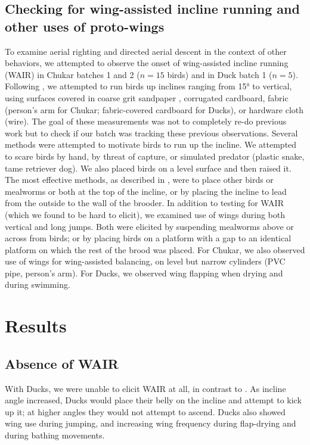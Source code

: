 \documentclass[10pt]{article}
\begin{document}

\subsection{Checking for wing-assisted incline running and other uses of proto-wings}
To examine aerial righting and directed aerial descent in the context of other behaviors, we attempted to observe the onset of wing-assisted incline running (WAIR) \citep{Dial:2003} in Chukar batches 1 and 2 ($n=15$ birds) and in Duck batch 1 ($n=5$).  Following \citep{Dial:2003}, we attempted to run birds up inclines ranging from \ang{15} to vertical, using surfaces covered in coarse grit sandpaper \citep{Dial:2003, Dial:2008, Jackson:2009, Tobalske:2011, Dial:2012}, corrugated cardboard, fabric (person's arm for Chukar; fabric-covered cardboard for Ducks), or hardware cloth (wire).  The goal of these measurements was not to completely re-do previous work \citep{Dial:2003} but to check if our batch was tracking these previous observations.   
	Several methods were attempted to motivate birds to run up the incline.  We attempted to scare birds by hand, by threat of capture, or simulated predator (plastic snake, tame retriever dog).  We also placed birds on a level surface and then raised it.  The most effective methods, as described in \citep{Jackson:2009}, were to place other birds or mealworms or both at the top of the incline, or by placing the incline to lead from the outside to the wall of the brooder. 
	In addition to testing for WAIR (which we found to be hard to elicit), we examined use of wings during both vertical and long jumps.  Both were elicited by suspending mealworms above or across from birds; or by placing birds on a platform with a gap to an identical platform on which the rest of the brood was placed.  For Chukar, we also observed use of wings for wing-assisted balancing, on level but narrow cylinders (PVC pipe, person's arm).  For Ducks, we observed wing flapping when drying and during swimming.  






\section{Results}
\subsection{Absence of WAIR}
With Ducks, we were unable to elicit WAIR at all, in contrast to \citep{Dial:2012}. As incline angle increased, Ducks would place their belly on the incline and attempt to kick up it; at higher angles they would not attempt to ascend. Ducks also showed wing use during jumping, and increasing wing frequency during flap-drying and during bathing movements.  
\end{document}
